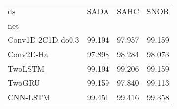 \begin{tabular}{lrrr}
\toprule
ds &   SADA &   SAHC &   SNOR \\
net               &        &        &        \\
\midrule
Conv1D-2C1D-do0.3 & 99.194 & 97.957 & 99.159 \\
Conv2D-Ha         & 97.898 & 98.284 & 98.073 \\
TwoLSTM           & 99.194 & 99.206 & 99.159 \\
TwoGRU            & 99.159 & 97.840 & 99.113 \\
CNN-LSTM          & 99.451 & 99.416 & 99.358 \\
\bottomrule
\end{tabular}
